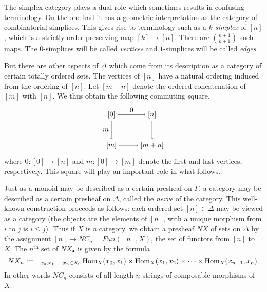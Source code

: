 \documentclass{amsart}
\begin{document}
The simplex category plays a dual role which sometimes results in confusing terminology. On the one had it has a geometric interpretation as the category of combinatorial simplices. This gives rise to terminology such as a {\em $k$-simplex} of $[n]$, which is a strictly order preserving map $[k] \to [n]$. There are $ {n+1}\choose {k+1}$ such maps. The $0$-simplices will be called {\em vertices} and $1$-simplices will be called {\em edges}. 

But there are other aspects of $\Delta$ which come from its description as a category of certain totally ordered sets. The vertices of $[n]$ have a natural ordering induced from the ordering of $[n]$. Let $[m + n]$ denote the ordered concatenation of $[m]$ with $[n]$. We thus obtain the following commuting square,
\begin{equation} \label{Eqn:Segal-Co-Map}
\begin{tikzpicture}[baseline = 0.75cm]
	\node (LT) at (0, 1.5) {$[0]$};
	\node (LB) at (0, 0) {$[m]$};
	\node (RT) at (2, 1.5) {$[n]$};
	\node (RB) at (2, 0) {$[m+n]$};
	\draw [->] (LT) -- node [left] {$m$} (LB);
	\draw [->] (LT) -- node [above] {$0$} (RT);
	\draw [->] (RT) -- node [right] {$$} (RB);
	\draw [->] (LB) -- node [below] {$$} (RB);
\end{tikzpicture}
\end{equation}
where $0: [0] \to [n]$ and $m: [0] \to [m]$ denote the first and last vertices, respectively. This square will play an important role in what follows. 

Just as a monoid may be described as a certain presheaf on $\Gamma$, a category may be described as a certain presheaf on $\Delta$, called the {\em nerve} of the category. This well-known construction proceeds as follows: each ordered set $[n] \in \Delta$ may be viewed as a category (the objects are the elements of $[n]$, with a unique morphism from $i$ to $j$ is $i \leq j$). Thus if $X$ is a category, we obtain a presheaf $NX$ of sets on $\Delta$ by the assignment $[n] \mapsto NC_n = Fun([n], X)$, the set of functors from $[n]$ to $X$.    
The $n^\textrm{th}$ set of $NX_{\bullet}$ is given by the formula
\begin{equation*}
	NX_n := \sqcup_{x_0, x_1, \dots, x_n \in X_0} \operatorname{Hom}_X(x_0, x_1) \times \operatorname{Hom}_X(x_1, x_2) \times \cdots \times \operatorname{Hom}_X(x_{n-1}, x_n).
\end{equation*}
In other words $NC_n$ consists of all length $n$ strings of composable morphisms of $X$.
\end{document}
